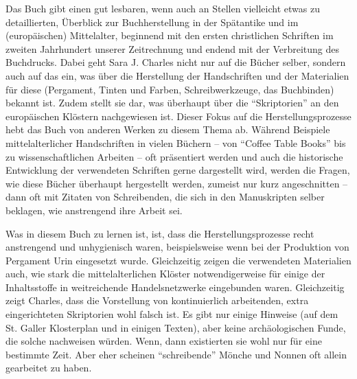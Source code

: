 \documentclass[a4paper,
fontsize=11pt,
oneside,
numbers=noperiodatend,
parskip=half-,
bibliography=totoc,
final
]{scrartcl}
\begin{document}
Das Buch gibt einen gut lesbaren, wenn auch an Stellen vielleicht etwas
zu detaillierten, Überblick zur Buchherstellung in der Spätantike und im
(europäischen) Mittelalter, beginnend mit den ersten christlichen
Schriften im zweiten Jahrhundert unserer Zeitrechnung und endend mit der
Verbreitung des Buchdrucks. Dabei geht Sara J. Charles nicht nur auf die
Bücher selber, sondern auch auf das ein, was über die Herstellung der
Handschriften und der Materialien für diese (Pergament, Tinten und
Farben, Schreibwerkzeuge, das Buchbinden) bekannt ist. Zudem stellt sie
dar, was überhaupt über die \enquote{Skriptorien} an den europäischen Klöstern
nachgewiesen ist. Dieser Fokus auf die Herstellungsprozesse hebt das
Buch von anderen Werken zu diesem Thema ab. Während Beispiele
mittelalterlicher Handschriften in vielen Büchern -- von \enquote{Coffee Table
Books} bis zu wissenschaftlichen Arbeiten -- oft präsentiert werden und
auch die historische Entwicklung der verwendeten Schriften gerne
dargestellt wird, werden die Fragen, wie diese Bücher überhaupt
hergestellt werden, zumeist nur kurz angeschnitten -- dann oft mit
Zitaten von Schreibenden, die sich in den Manuskripten selber beklagen,
wie anstrengend ihre Arbeit sei.

Was in diesem Buch zu lernen ist, ist, dass die Herstellungsprozesse
recht anstrengend und unhygienisch waren, beispielsweise wenn bei der
Produktion von Pergament Urin eingesetzt wurde. Gleichzeitig zeigen die
verwendeten Materialien auch, wie stark die mittelalterlichen Klöster
notwendigerweise für einige der Inhaltsstoffe in weitreichende
Handelsnetzwerke eingebunden waren. Gleichzeitig zeigt Charles, dass die
Vorstellung von kontinuierlich arbeitenden, extra eingerichteten
Skriptorien wohl falsch ist. Es gibt nur einige Hinweise (auf dem St.
Galler Klosterplan und in einigen Texten), aber keine archäologischen
Funde, die solche nachweisen würden. Wenn, dann existierten sie wohl nur
für eine bestimmte Zeit. Aber eher scheinen \enquote{schreibende} Mönche
und Nonnen oft allein gearbeitet zu haben.
\end{document}
